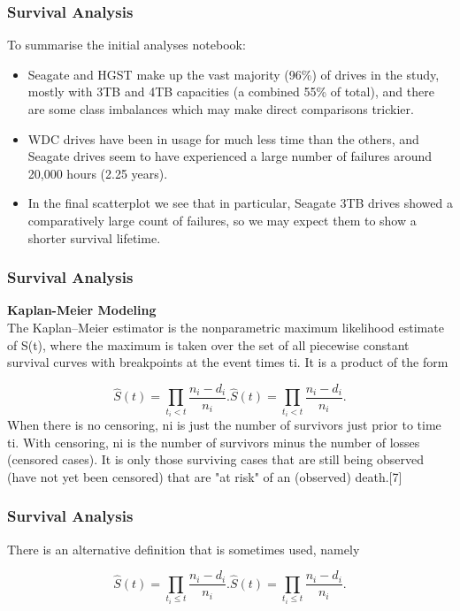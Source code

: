 \documentclass[]{beamer}
\begin{document}
	\begin{frame}
		\frametitle{Survival Analysis}
		To summarise the initial analyses notebook:
		
		\begin{itemize}
			\item Seagate and HGST make up the vast majority (96\%) of drives in the study, mostly with 3TB and 4TB capacities (a combined 55\% of total), and there are some class imbalances which may make direct comparisons trickier.
			
			\item WDC drives have been in usage for much less time than the others, and Seagate drives seem to have experienced a large number of failures around 20,000 hours (2.25 years).
			
			\item In the final scatterplot we see that in particular, Seagate 3TB drives showed a comparatively large count of failures, so we may expect them to show a shorter survival lifetime.
		\end{itemize}
		
	\end{frame}
	\begin{frame}
		\frametitle{Survival Analysis}
		\noindent \textbf{Kaplan-Meier Modeling} \\
		
		
		The Kaplan–Meier estimator is the nonparametric maximum likelihood estimate of S(t), where the maximum is taken over the set of all piecewise constant survival curves with breakpoints at the event times ti. It is a product of the form
		
		\[{\displaystyle {\hat {S}}(t)=\prod \limits _{t_{i}<t}{\frac {n_{i}-d_{i}}{n_{i}}}.} \hat S(t) = \prod\limits_{t_i<t} \frac{n_i-d_i}{n_i}.\]
		When there is no censoring, ni is just the number of survivors just prior to time ti. With censoring, ni is the number of survivors minus the number of losses (censored cases). It is only those surviving cases that are still being observed (have not yet been censored) that are "at risk" of an (observed) death.[7]
	\end{frame}
	\begin{frame}
		\frametitle{Survival Analysis}
		There is an alternative definition that is sometimes used, namely
		
		\[{\displaystyle {\hat {S}}(t)=\prod \limits _{t_{i}\leq t}{\frac {n_{i}-d_{i}}{n_{i}}}.} \hat S(t) = \prod\limits_{t_i \le t} \frac{n_i-d_i}{n_i}.\]
		
	\end{frame}
\end{document}
